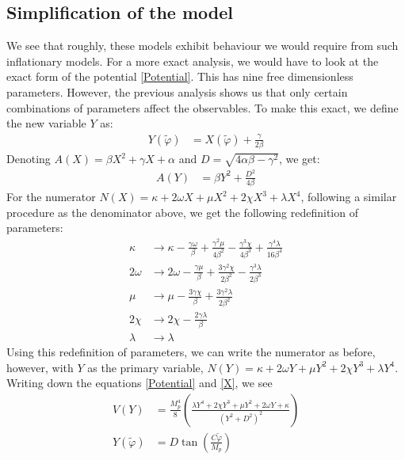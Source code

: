 \documentclass[aps,prd,reprint,preprintnumbers,showpacs,floatfix,nofootinbib,superscript address]{revtex4-2}
\begin{document}
\subsection{Simplification of the model} \label{Reduction of parameters}
We see that roughly, these models exhibit behaviour we would require from such inflationary models. For a more exact analysis, we would have to look at the exact form of the potential \ref{Potential}. This has nine free dimensionless parameters. However, the previous analysis shows us that only certain combinations of parameters affect the observables. To make this exact, we define the new variable $Y$ as:
\begin{align}
    Y(\tilde{\varphi}) &= X(\tilde{\varphi}) + \frac{\gamma}{2\beta}
\end{align}
Denoting $A(X) = \beta X^2 + \gamma X + \alpha$ and $D = \sqrt{4\alpha\beta-\gamma^2}$, we get:
\begin{align}
    A(Y) &= \beta Y^2 + \frac{D^2}{4\beta} \nonumber
\end{align}
For the numerator $N(X) = \kappa + 2\omega X +\mu X^2 + 2\chi X^3 + \lambda X^4$, following a similar procedure as the denominator above, we get the following redefinition of parameters: 
\begin{align}
    \kappa &\rightarrow \kappa - \frac{\gamma\omega}{\beta} + \frac{\gamma^2\mu}{4\beta^2} - \frac{\gamma^3\chi}{4\beta^3} +\frac{\gamma^4\lambda}{16\beta^4}    \nonumber \\
    2\omega &\rightarrow 2\omega - \frac{\gamma\mu}{\beta} + \frac{3\gamma^2\chi}{2\beta^2} - \frac{\gamma^3\lambda}{2\beta^3}   \nonumber \\
    \mu &\rightarrow \mu - \frac{3\gamma\chi}{\beta} + \frac{3\gamma^2\lambda}{2\beta^2} \nonumber \\
    2\chi &\rightarrow 2\chi - \frac{2\gamma\lambda}{\beta} \nonumber \\
    \lambda &\rightarrow \lambda \label{huge redefiniton}
\end{align}
Using this redefinition of parameters, we can write the numerator as before, however, with $Y$ as the primary variable, $N(Y) = \kappa + 2\omega Y +\mu Y^2 + 2\chi Y^3 + \lambda Y^4$. Writing down the equations \ref{Potential} and \ref{X}, we see
\begin{align}
    V(Y) &= \frac{M_p^4}{8} \left(\frac{\lambda Y^4 + 2 \chi Y^3 + \mu Y^2  + 2\omega Y + \kappa}{(Y^2 + D^2)^2} \right) \nonumber \\
    Y(\tilde{\varphi}) &= D \tan \left(\frac{C \tilde{\varphi}}{M_p} \right) \nonumber
\end{align}
\end{document}
